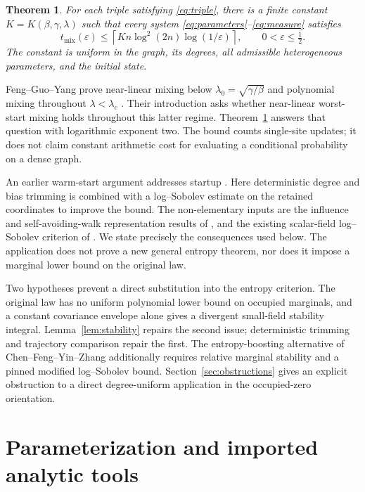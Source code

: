 \documentclass[11pt]{article}
\newtheorem{theorem}{Theorem}
\theoremstyle{remark}\newtheorem{remark}[theorem]{Remark}
\begin{document}
\begin{theorem}\label{thm:main}
For each triple satisfying \eqref{eq:triple}, there is a finite constant
$K=K(\beta,\gamma,\lambda)$ such that every system
\eqref{eq:parameters}--\eqref{eq:measure} satisfies
\[
 t_{\mathrm{mix}}(\varepsilon)
 \leq\left\lceil K n\log^2(2n)\log(1/\varepsilon)\right\rceil,
 \qquad 0<\varepsilon\leq\tfrac12.
\]
The constant is uniform in the graph, its degrees, all admissible
heterogeneous parameters, and the initial state.
\end{theorem}

Feng--Guo--Yang prove near-linear mixing below
$\lambda_0=\sqrt{\gamma/\beta}$ and polynomial mixing throughout
$\lambda<\lambda_c$ \cite[Theorems~5--6]{FGY26}. Their introduction asks
whether near-linear worst-start mixing holds throughout this latter
regime. Theorem~\ref{thm:main} answers that question with logarithmic
exponent two. The bound counts single-site updates; it does not claim
constant arithmetic cost for evaluating a conditional probability on a
dense graph.

An earlier warm-start argument addresses startup \cite[Lemma~63]{FGY26}.
Here deterministic degree and bias trimming is combined with a
log--Sobolev estimate on the retained coordinates to improve the bound.
The non-elementary inputs are the influence and self-avoiding-walk
representation results of \cite{FGY26}, and the existing scalar-field
log--Sobolev criterion of \cite{MY26}. We state precisely the consequences
used below. The application does not prove a new general entropy theorem,
nor does it impose a marginal lower bound on the original law.

Two hypotheses prevent a direct substitution into the entropy criterion.
The original law has no uniform polynomial lower bound on occupied
marginals, and a constant covariance envelope alone gives a divergent
small-field stability integral. Lemma~\ref{lem:stability} repairs the
second issue; deterministic trimming and trajectory comparison repair
the first. The entropy-boosting alternative of Chen--Feng--Yin--Zhang
\cite[Definition~1.9 and Theorem~1.11]{CFYZ22} additionally requires
relative marginal stability and a pinned modified log--Sobolev bound.
Section~\ref{sec:obstructions} gives an explicit obstruction to a direct
degree-uniform application in the occupied-zero orientation.

\section{Parameterization and imported analytic tools}
\end{document}
